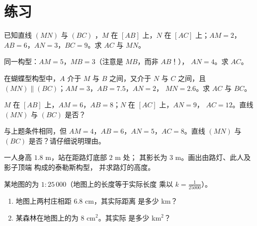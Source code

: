 \section{练习}

\begin{exercise}[$\star$]\label{exo:g9:thales:1}
已知直线 $(MN)$ 与 $(BC)$ ，$M$ 在 $[AB]$ 上，$N$ 在
$[AC]$ 上；$AM = 2$，$AB = 6$，$AN = 3$，$BC = 9$。求 $AC$ 与 $MN$。
\end{exercise}

\begin{exercise}[$\star$]\label{exo:g9:thales:2}
同一构型：$AM = 5$，$MB = 3$（注意是 $MB$，而非 $AB$！），
$AN = 4$。求 $AC$。
\end{exercise}

\begin{exercise}[$\star$]\label{exo:g9:thales:3}
在蝴蝶型构型中，$A$ 介于 $M$ 与 $B$ 之间，又介于 $N$
与 $C$ 之间，且 $(MN) \parallel (BC)$；$AM = 3$，$AB = 7.5$，$AN = 2$，
$MN = 2.6$。求 $AC$ 与 $BC$。
\end{exercise}

\begin{exercise}[$\star$]\label{exo:g9:thales:4}
$M$ 在 $[AB]$ 上，$AM = 6$，$AB = 8$；$N$ 在 $[AC]$ 上，$AN = 9$，
$AC = 12$。直线 $(MN)$ 与 $(BC)$ 是否？
\end{exercise}

\begin{exercise}[$\star\star$]\label{exo:g9:thales:5}
与上题条件相同，但 $AM = 4$，$AB = 6$，$AN = 5$，$AC = 8$。直线 $(MN)$
与 $(BC)$ 是否？请仔细说明理由。
\end{exercise}

\begin{exercise}[$\star\star$]\label{exo:g9:thales:6}
一人身高 $1.8$ m，站在距路灯底部 $2$ m 处；
其影长为 $3$ m。画出由路灯、此人及影子顶端
构成的泰勒斯构型，
并求路灯的高度。
\end{exercise}

\begin{exercise}[$\star\star$]\label{exo:g9:thales:7}
某地图的为 $1 : 25\,000$（地图上的长度等于实际长度
乘以 $k = \frac{1}{25000}$）。
\begin{enumerate}
  \item 地图上两村庄相距 $6.8$ cm，其实际距离
        是多少 km？
  \item 某森林在地图上的为 $8$ cm$^2$。其实际
        是多少 km$^2$？
\end{enumerate}
\end{exercise}

